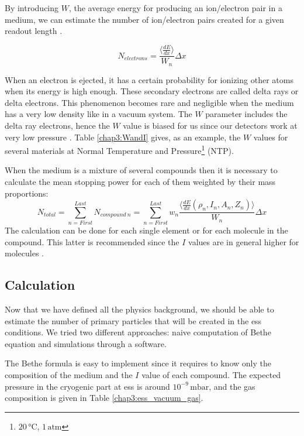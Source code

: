 \begin{refsection}
	By introducing \(W\), the average energy for producing an ion/electron pair in a medium, we can estimate the number of ion/electron pairs created for a given readout length \cite[]{Weiss1955,Bichsel1979}.

	\begin{equation}
		N_{electrons}= \frac{\big \langle \frac{dE}{dx} \big \rangle}{W_{n}} \Delta x
	\end{equation}

	When an electron is ejected, it has a certain probability for ionizing other atoms when its energy is high enough. These secondary electrons are called delta rays or delta electrons. This phenomenon becomes rare and negligible when the medium has a very low density like in a vacuum system. The \(W\) parameter includes the delta ray electrons, hence the \(W\) value is biased for us since our detectors work at very low pressure \cite[p. 470]{Tanabashi2018}. Table \ref{chap3:WandI} gives, as an example, the \(W\) values for several materials at Normal Temperature and Pressure\footnote{$20\,\mathrm{°C}$, $1\,\mathrm{atm}$} (NTP).

	

	When the medium is a mixture of several compounds then it is necessary to calculate the mean stopping power for each of them weighted by their mass proportions:
	\begin{equation}
		N_{total}= \sum_{n= First}^{Last} N_{compound\ n}= \sum_{n= First}^{Last} w_{n} \frac{\big \langle \frac{dE}{dx}\left(\rho_{n},I_{n},A_{n},Z_{n}\right) \big \rangle}{W_{n}} \Delta x
	\end{equation}
	The calculation can be done for each single element or for each molecule in the compound.
	This latter is recommended since the \(I\) values are in general higher for molecules \cite[p. 451]{Tanabashi2018}.

	\subsection{Calculation}

	Now that we have defined all the physics background, we should be able to estimate the number of primary particles that will be created in the \acrshort{ess} conditions. We tried two different approaches: naive computation of Bethe equation and simulations through a software.

	The Bethe formula is easy to implement since it requires to know only the composition of the medium and the \(I\) value of each compound. The expected pressure in the cryogenic part at \acrshort{ess} is around \(10^{-9}\,\mathrm{mbar}\), and the gas composition is given in Table \ref{chap3:ess_vacuum_gas}.


\end{refsection}
